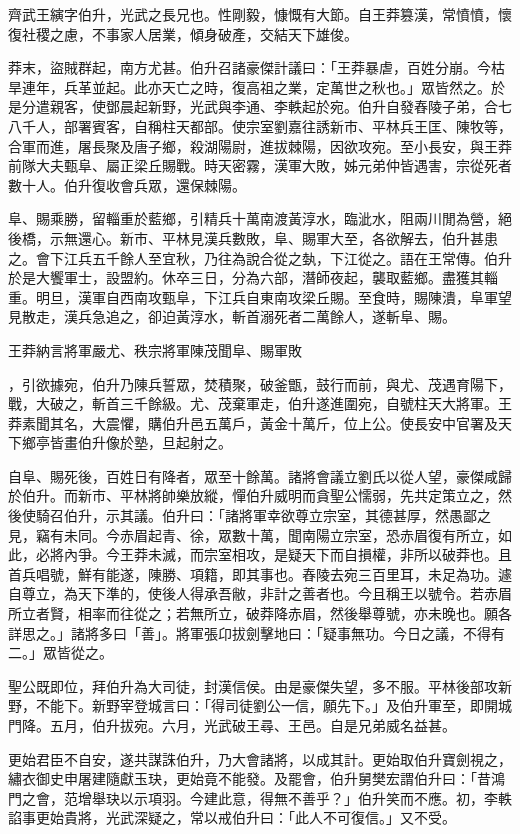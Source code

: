 
\begin{pinyinscope}
齊武王縯字伯升，光武之長兄也。性剛毅，慷慨有大節。自王莽篡漢，常憤憤，懷復社稷之慮，不事家人居業，傾身破產，交結天下雄俊。

莽末，盜賊群起，南方尤甚。伯升召諸豪傑計議曰：「王莽暴虐，百姓分崩。今枯旱連年，兵革並起。此亦天亡之時，復高祖之業，定萬世之秋也。」眾皆然之。於是分遣親客，使鄧晨起新野，光武與李通、李軼起於宛。伯升自發舂陵子弟，合七八千人，部署賓客，自稱柱天都部。使宗室劉嘉往誘新市、平林兵王匡、陳牧等，合軍而進，屠長聚及唐子鄉，殺湖陽尉，進拔棘陽，因欲攻宛。至小長安，與王莽前隊大夫甄阜、屬正梁丘賜戰。時天密霧，漢軍大敗，姊元弟仲皆遇害，宗從死者數十人。伯升復收會兵眾，還保棘陽。

阜、賜乘勝，留輜重於藍鄉，引精兵十萬南渡黃淳水，臨泚水，阻兩川閒為營，絕後橋，示無還心。新巿、平林見漢兵數敗，阜、賜軍大至，各欲解去，伯升甚患之。會下江兵五千餘人至宜秋，乃往為說合從之埶，下江從之。語在王常傳。伯升於是大饗軍士，設盟約。休卒三日，分為六部，潛師夜起，襲取藍鄉。盡獲其輜重。明旦，漢軍自西南攻甄阜，下江兵自東南攻梁丘賜。至食時，賜陳潰，阜軍望見散走，漢兵急追之，卻迫黃淳水，斬首溺死者二萬餘人，遂斬阜、賜。

王莽納言將軍嚴尤、秩宗將軍陳茂聞阜、賜軍敗

，引欲據宛，伯升乃陳兵誓眾，焚積聚，破釜甑，鼓行而前，與尤、茂遇育陽下，戰，大破之，斬首三千餘級。尤、茂棄軍走，伯升遂進圍宛，自號柱天大將軍。王莽素聞其名，大震懼，購伯升邑五萬戶，黃金十萬斤，位上公。使長安中官署及天下鄉亭皆畫伯升像於塾，旦起射之。

自阜、賜死後，百姓日有降者，眾至十餘萬。諸將會議立劉氏以從人望，豪傑咸歸於伯升。而新巿、平林將帥樂放縱，憚伯升威明而貪聖公懦弱，先共定策立之，然後使騎召伯升，示其議。伯升曰：「諸將軍幸欲尊立宗室，其德甚厚，然愚鄙之見，竊有未同。今赤眉起青、徐，眾數十萬，聞南陽立宗室，恐赤眉復有所立，如此，必將內爭。今王莽未滅，而宗室相攻，是疑天下而自損權，非所以破莽也。且首兵唱號，鮮有能遂，陳勝、項籍，即其事也。舂陵去宛三百里耳，未足為功。遽自尊立，為天下準的，使後人得承吾敝，非計之善者也。今且稱王以號令。若赤眉所立者賢，相率而往從之；若無所立，破莽降赤眉，然後舉尊號，亦未晚也。願各詳思之。」諸將多曰「善」。將軍張卬拔劍擊地曰：「疑事無功。今日之議，不得有二。」眾皆從之。

聖公既即位，拜伯升為大司徒，封漢信侯。由是豪傑失望，多不服。平林後部攻新野，不能下。新野宰登城言曰：「得司徒劉公一信，願先下。」及伯升軍至，即開城門降。五月，伯升拔宛。六月，光武破王尋、王邑。自是兄弟威名益甚。

更始君臣不自安，遂共謀誅伯升，乃大會諸將，以成其計。更始取伯升寶劍視之，繡衣御史申屠建隨獻玉玦，更始竟不能發。及罷會，伯升舅樊宏謂伯升曰：「昔鴻門之會，范增舉玦以示項羽。今建此意，得無不善乎？」伯升笑而不應。初，李軼諂事更始貴將，光武深疑之，常以戒伯升曰：「此人不可復信。」又不受。


\end{pinyinscope}
